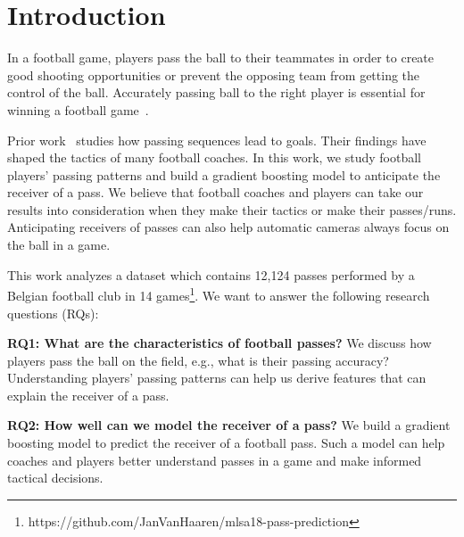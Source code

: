 \section{Introduction} \label{intro}
In a football game, players pass the ball to their teammates in order to create good shooting opportunities or prevent the opposing team from getting the control of the ball.
Accurately passing ball to the right player is essential for winning a football game~\cite{Ali2011Measuring,Hughes2005Analysis}.

Prior work~\cite{reep1968skill,Hughes2005Analysis} studies how passing sequences lead to goals. Their findings have shaped the tactics of many football coaches.
In this work, we study football players' passing patterns and build a gradient boosting model to anticipate the receiver of a pass.
We believe that football coaches and players can take our results into consideration when they make their tactics or make their passes/runs. 
Anticipating receivers of passes can also help automatic cameras always focus on the ball in a game.

This work analyzes a dataset which contains 12,124 passes performed by a Belgian football club in 14 games\footnote{\label{origin_dataset}https://github.com/JanVanHaaren/mlsa18-pass-prediction}. We want to answer the following research questions (RQs): 

\begin{description}
	\item \textbf{RQ1: What are the characteristics of football passes?}
	We discuss how players pass the ball on the field, e.g., what is their passing accuracy? %
	Understanding players' passing patterns can help us derive features that can explain the receiver of a pass. 
	
	\item \textbf{RQ2: How well can we model the receiver of a pass?}
	We build a gradient boosting model to predict the receiver of a football pass. 
	Such a model can help coaches and players better understand passes in a game and make informed tactical decisions.
	
\end{description}

